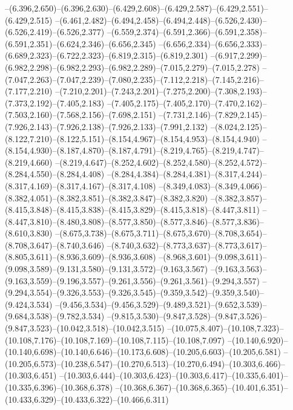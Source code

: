   --(6.396,2.650)--(6.396,2.630)--(6.429,2.608)--(6.429,2.587)--(6.429,2.551)--(6.429,2.515)%
  --(6.461,2.482)--(6.494,2.458)--(6.494,2.448)--(6.526,2.430)--(6.526,2.419)--(6.526,2.377)%
  --(6.559,2.374)--(6.591,2.366)--(6.591,2.358)--(6.591,2.351)--(6.624,2.346)--(6.656,2.345)%
  --(6.656,2.334)--(6.656,2.333)--(6.689,2.323)--(6.722,2.323)--(6.819,2.315)--(6.819,2.301)%
  --(6.917,2.299)--(6.982,2.298)--(6.982,2.293)--(6.982,2.289)--(7.015,2.279)--(7.015,2.278)%
  --(7.047,2.263)--(7.047,2.239)--(7.080,2.235)--(7.112,2.218)--(7.145,2.216)--(7.177,2.210)%
  --(7.210,2.201)--(7.243,2.201)--(7.275,2.200)--(7.308,2.193)--(7.373,2.192)--(7.405,2.183)%
  --(7.405,2.175)--(7.405,2.170)--(7.470,2.162)--(7.503,2.160)--(7.568,2.156)--(7.698,2.151)%
  --(7.731,2.146)--(7.829,2.145)--(7.926,2.143)--(7.926,2.138)--(7.926,2.133)--(7.991,2.132)%
  --(8.024,2.125)--(8.122,7.210)--(8.122,5.151)--(8.154,4.967)--(8.154,4.953)--(8.154,4.940)%
  --(8.154,4.930)--(8.187,4.870)--(8.187,4.791)--(8.219,4.765)--(8.219,4.747)--(8.219,4.660)%
  --(8.219,4.647)--(8.252,4.602)--(8.252,4.580)--(8.252,4.572)--(8.284,4.550)--(8.284,4.408)%
  --(8.284,4.384)--(8.284,4.381)--(8.317,4.244)--(8.317,4.169)--(8.317,4.167)--(8.317,4.108)%
  --(8.349,4.083)--(8.349,4.066)--(8.382,4.051)--(8.382,3.851)--(8.382,3.847)--(8.382,3.820)%
  --(8.382,3.857)--(8.415,3.848)--(8.415,3.838)--(8.415,3.829)--(8.415,3.818)--(8.447,3.811)%
  --(8.447,3.810)--(8.480,3.808)--(8.577,3.850)--(8.577,3.846)--(8.577,3.836)--(8.610,3.830)%
  --(8.675,3.738)--(8.675,3.711)--(8.675,3.670)--(8.708,3.654)--(8.708,3.647)--(8.740,3.646)%
  --(8.740,3.632)--(8.773,3.637)--(8.773,3.617)--(8.805,3.611)--(8.936,3.609)--(8.936,3.608)%
  --(8.968,3.601)--(9.098,3.611)--(9.098,3.589)--(9.131,3.580)--(9.131,3.572)--(9.163,3.567)%
  --(9.163,3.563)--(9.163,3.559)--(9.196,3.557)--(9.261,3.556)--(9.261,3.561)--(9.294,3.557)%
  --(9.294,3.554)--(9.326,3.553)--(9.326,3.545)--(9.359,3.542)--(9.359,3.540)--(9.424,3.534)%
  --(9.456,3.534)--(9.456,3.529)--(9.489,3.521)--(9.652,3.539)--(9.684,3.538)--(9.782,3.534)%
  --(9.815,3.530)--(9.847,3.528)--(9.847,3.526)--(9.847,3.523)--(10.042,3.518)--(10.042,3.515)%
  --(10.075,8.407)--(10.108,7.323)--(10.108,7.176)--(10.108,7.169)--(10.108,7.115)--(10.108,7.097)%
  --(10.140,6.920)--(10.140,6.698)--(10.140,6.646)--(10.173,6.608)--(10.205,6.603)--(10.205,6.581)%
  --(10.205,6.573)--(10.238,6.547)--(10.270,6.513)--(10.270,6.494)--(10.303,6.466)--(10.303,6.451)%
  --(10.303,6.444)--(10.303,6.423)--(10.303,6.417)--(10.335,6.401)--(10.335,6.396)--(10.368,6.378)%
  --(10.368,6.367)--(10.368,6.365)--(10.401,6.351)--(10.433,6.329)--(10.433,6.322)--(10.466,6.311)%
